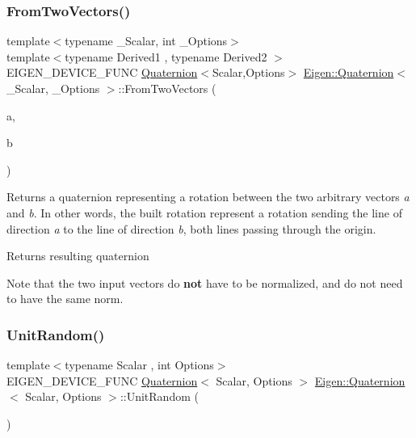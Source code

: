 \subsubsection{\texorpdfstring{FromTwoVectors()}{FromTwoVectors()}}
{\footnotesize\ttfamily template$<$typename \+\_\+\+Scalar, int \+\_\+\+Options$>$ \\
template$<$typename Derived1 , typename Derived2 $>$ \\
E\+I\+G\+E\+N\+\_\+\+D\+E\+V\+I\+C\+E\+\_\+\+F\+U\+NC \mbox{\hyperlink{class_eigen_1_1_quaternion}{Quaternion}}$<$Scalar,Options$>$ \mbox{\hyperlink{class_eigen_1_1_quaternion}{Eigen\+::\+Quaternion}}$<$ \+\_\+\+Scalar, \+\_\+\+Options $>$\+::From\+Two\+Vectors (\begin{DoxyParamCaption}\item[{const \mbox{\hyperlink{class_eigen_1_1_matrix_base}{Matrix\+Base}}$<$ Derived1 $>$ \&}]{a,  }\item[{const \mbox{\hyperlink{class_eigen_1_1_matrix_base}{Matrix\+Base}}$<$ Derived2 $>$ \&}]{b }\end{DoxyParamCaption})}

Returns a quaternion representing a rotation between the two arbitrary vectors {\itshape a} and {\itshape b}. In other words, the built rotation represent a rotation sending the line of direction {\itshape a} to the line of direction {\itshape b}, both lines passing through the origin.

\begin{DoxyReturn}{Returns}
resulting quaternion
\end{DoxyReturn}
Note that the two input vectors do {\bfseries{not}} have to be normalized, and do not need to have the same norm. \mbox{\label{class_eigen_1_1_quaternion_a8a61f4092bc520c7291e5b5e16e80d71}} 
\subsubsection{\texorpdfstring{UnitRandom()}{UnitRandom()}}
{\footnotesize\ttfamily template$<$typename Scalar , int Options$>$ \\
E\+I\+G\+E\+N\+\_\+\+D\+E\+V\+I\+C\+E\+\_\+\+F\+U\+NC \mbox{\hyperlink{class_eigen_1_1_quaternion}{Quaternion}}$<$ Scalar, Options $>$ \mbox{\hyperlink{class_eigen_1_1_quaternion}{Eigen\+::\+Quaternion}}$<$ Scalar, Options $>$\+::Unit\+Random (\begin{DoxyParamCaption}{ }\end{DoxyParamCaption})\hspace{0.3cm}{\ttfamily [static]}}

